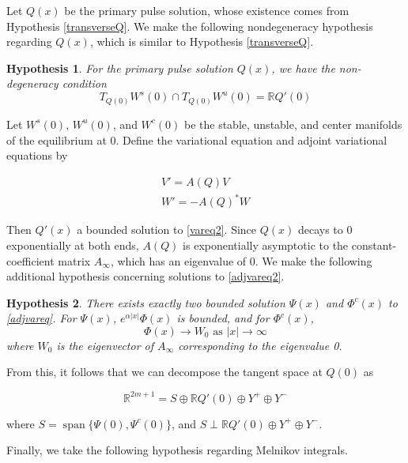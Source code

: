 \documentclass[12pt]{article}
\def\R{{\mathbb R}}
\DeclareMathOperator{\spn}{span}
\newtheorem{hypothesis}{Hypothesis}
\begin{document}
Let $Q(x)$ be the primary pulse solution, whose existence comes from Hypothesis \ref{transverseQ}. We make the following nondegeneracy hypothesis regarding $Q(x)$, which is similar to Hypothesis \ref{transverseQ}.

\begin{hypothesis}\label{nondegen}
For the primary pulse solution $Q(x)$, we have the non-degeneracy condition
\begin{equation}
T_{Q(0)}W^s(0) \cap T_{Q(0)}W^u(0) = \R Q'(0)
\end{equation}
\end{hypothesis}

Let $W^s(0)$, $W^u(0)$, and $W^c(0)$ be the stable, unstable, and center manifolds of the equilibrium at 0. Define the variational equation and adjoint variational equations by

\begin{align}
V' = A(Q) V \label{vareq2} \\
W' = -A(Q)^* W \label{adjvareq2}
\end{align}

Then $Q'(x)$ a bounded solution to \eqref{vareq2}. Since $Q(x)$ decays to 0 exponentially at both ends, $A(Q)$ is exponentially asymptotic to the constant-coefficient matrix $A_\infty$, which has an eigenvalue of 0. We make the following additional hypothesis concerning solutions to \eqref{adjvareq2}.

\begin{hypothesis}\label{adjsolutions}
There exists exactly two bounded solution $\Psi(x)$ and $\Phi^c(x)$ to \eqref{adjvareq}. For $\Psi(x)$, $e^{\alpha |x|}\Phi(x)$ is bounded, and for $\Phi^c(x)$,
\begin{equation}
\Phi(x) \rightarrow W_0 \text{ as }|x| \rightarrow \infty
\end{equation}
where $W_0$ is the eigenvector of $A_\infty$ corresponding to the eigenvalue 0.
\end{hypothesis}

From this, it follows that we can decompose the tangent space at $Q(0)$ as 

\begin{equation}
\R^{2m+1} = S \oplus \R Q'(0) \oplus Y^+ \oplus Y^-
\end{equation}

where $S = \spn\{ \Psi(0), \Psi^c(0) \}$, and $S \perp \R Q'(0) \oplus Y^+ \oplus Y^-$.

Finally, we take the following hypothesis regarding Melnikov integrals.
\end{document}
